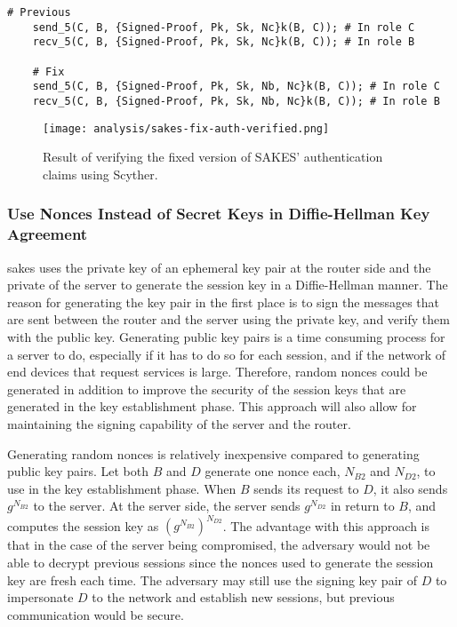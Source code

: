 \begin{lstlisting}[caption={Fix to the SAKES protocol to provide non-injective synchronization and data agreement for the end router $B$ during the authentication phase.}, label={lst:fix-nisynch-b-auth}]
	# Previous
	send_5(C, B, {Signed-Proof, Pk, Sk, Nc}k(B, C)); # In role C
	recv_5(C, B, {Signed-Proof, Pk, Sk, Nc}k(B, C)); # In role B
	
	# Fix
	send_5(C, B, {Signed-Proof, Pk, Sk, Nb, Nc}k(B, C)); # In role C
	recv_5(C, B, {Signed-Proof, Pk, Sk, Nb, Nc}k(B, C)); # In role B
\end{lstlisting}


\begin{figure}[h]
	\centering
	\texttt{[image: analysis/sakes-fix-auth-verified.png]}
	\caption{Result of verifying the fixed version of SAKES' authentication claims using Scyther.}
	\label{fig:sakes-fix-verified-auth}
\end{figure}



\subsubsection{Use Nonces Instead of Secret Keys in Diffie-Hellman Key Agreement}

\gls{sakes} uses the private key of an ephemeral key pair at the router side and the private of the server to generate the session key in a Diffie-Hellman manner. The reason for generating the key pair in the first place is to sign the messages that are sent between the router and the server using the private key, and verify them with the public key. Generating public key pairs is a time consuming process for a server to do, especially if it has to do so for each session, and if the network of end devices that request services is large. Therefore, random nonces could be generated in addition to improve the security of the session keys that are generated in the key establishment phase. This approach will also allow for maintaining the signing capability of the server and the router.

Generating random nonces is relatively inexpensive compared to generating public key pairs. Let both $B$ and $D$ generate one nonce each, $N_{B2}$ and $N_{D2}$, to use in the key establishment phase. When $B$ sends its request to $D$, it also sends $g^{N_{B2}}$ to the server. At the server side, the server sends $g^{N_{D2}}$ in return to $B$, and computes the session key as $(g^{N_{B2}})^{N_{D2}}$. The advantage with this approach is that in the case of the server being compromised, the adversary would not be able to decrypt previous sessions since the nonces used to generate the session key are fresh each time. The adversary may still use the signing key pair of $D$ to impersonate $D$ to the network and establish new sessions, but previous communication would be secure.


